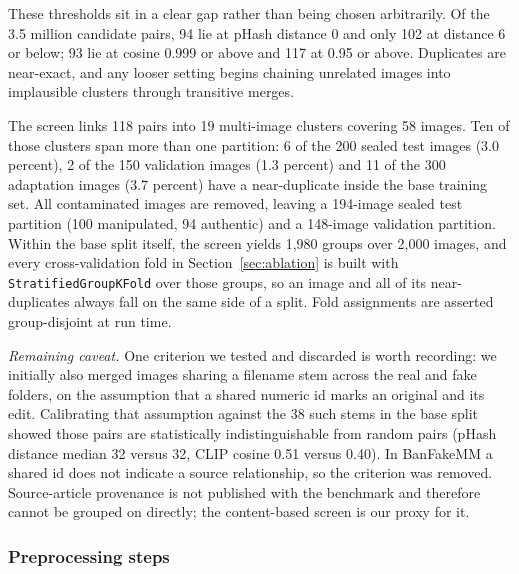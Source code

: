 \documentclass[conference,a4paper]{IEEEtran}
\begin{document}
These thresholds sit in a clear gap rather than being chosen arbitrarily. Of
the 3.5 million candidate pairs, 94 lie at pHash distance 0 and only 102 at
distance 6 or below; 93 lie at cosine 0.999 or above and 117 at 0.95 or above.
Duplicates are near-exact, and any looser setting begins chaining unrelated
images into implausible clusters through transitive merges.

The screen links 118 pairs into 19 multi-image clusters covering 58 images.
Ten of those clusters span more than one partition: 6 of the 200 sealed test
images (3.0 percent), 2 of the 150 validation images (1.3 percent) and 11 of
the 300 adaptation images (3.7 percent) have a near-duplicate inside the base
training set. All contaminated images are removed, leaving a 194-image sealed
test partition (100 manipulated, 94 authentic) and a 148-image validation
partition. Within the base split itself, the screen yields 1{,}980 groups over
2{,}000 images, and every cross-validation fold in Section~\ref{sec:ablation}
is built with \texttt{StratifiedGroupKFold} over those groups, so an image and
all of its near-duplicates always fall on the same side of a split. Fold
assignments are asserted group-disjoint at run time.

\emph{Remaining caveat.} One criterion we tested and discarded is worth
recording: we initially also merged images sharing a filename stem across the
real and fake folders, on the assumption that a shared numeric id marks an
original and its edit. Calibrating that assumption against the 38 such stems
in the base split showed those pairs are statistically indistinguishable from
random pairs (pHash distance median 32 versus 32, CLIP cosine 0.51 versus
0.40). In BanFakeMM a shared id does not indicate a source relationship, so
the criterion was removed. Source-article provenance is not published with the
benchmark and therefore cannot be grouped on directly; the content-based
screen is our proxy for it.

\subsubsection{Preprocessing steps}
\end{document}
